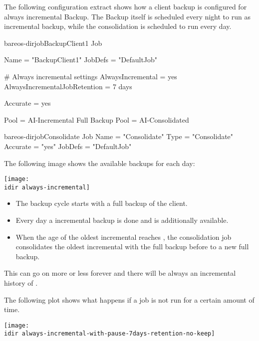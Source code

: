 The following configuration extract shows how a client backup is configured for always incremental Backup.
The Backup itself is scheduled every night to run as incremental backup, while the consolidation is scheduled to run every day.

\begin{bareosConfigResource}{bareos-dir}{job}{BackupClient1}
Job {
    Name = "BackupClient1"
    JobDefs = "DefaultJob"

    # Always incremental settings
    AlwaysIncremental = yes
    AlwaysIncrementalJobRetention = 7 days

    Accurate = yes

    Pool = AI-Incremental
    Full Backup Pool = AI-Consolidated
}
\end{bareosConfigResource}

\begin{bareosConfigResource}{bareos-dir}{job}{Consolidate}
Job {
    Name = "Consolidate"
    Type = "Consolidate"
    Accurate = "yes"
    JobDefs = "DefaultJob"
}
\end{bareosConfigResource}



The following image shows the available backups for each day:

\begin{center}
\texttt{[image: \\idir always-incremental]}
\end{center}


\begin{itemize}
    \item The backup cycle starts with a full backup of the client. 
    \item Every day a incremental backup is done and is additionally available.
    \item When the age of the oldest incremental reaches , the consolidation job consolidates the oldest incremental with the full backup before to a new full backup.
\end{itemize}

This can go on more or less forever and there will be always an incremental history of .

The following plot shows what happens if a job is not run for a certain amount of time.

\begin{center}
\texttt{[image: \\idir always-incremental-with-pause-7days-retention-no-keep]}
\end{center}

